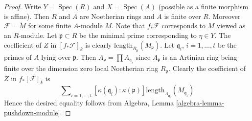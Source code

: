 \documentclass[10pt,a4paper]{amsart}
\theoremstyle{plain}
\theoremstyle{definition}
\theoremstyle{remark}
\numberwithin{equation}{subsection}
\def\Spec{\mathop{\mathrm{Spec}}}
\begin{document}
\begin{proof}
\medskip\noindent
Write $Y = \Spec(R)$ and $X = \Spec(A)$ (possible as
a finite morphism is affine).
Then $R$ and $A$ are Noetherian rings and $A$ is finite over $R$.
Moreover $\mathcal{F} = \widetilde{M}$ for some finite $A$-module
$M$. Note that $f_*\mathcal{F}$ corresponds to $M$ viewed as an $R$-module.
Let $\mathfrak p \subset R$ be the minimal prime corresponding
to $\eta \in Y$. The coefficient of $Z$ in $[f_*\mathcal{F}]_k$
is clearly $\text{length}_{R_{\mathfrak p}}(M_{\mathfrak p})$.
Let $\mathfrak q_i$, $i = 1, \ldots, t$ be the primes of $A$
lying over $\mathfrak p$. Then $A_{\mathfrak p} = \prod A_{\mathfrak q_i}$
since $A_{\mathfrak p}$ is an Artinian ring being finite over the
dimension zero local Noetherian ring $R_{\mathfrak p}$.
Clearly the coefficient of $Z$ in $f_*[\mathcal{F}]_k$ is
$$
\sum\nolimits_{i = 1, \ldots, t}
[\kappa(\mathfrak q_i) : \kappa(\mathfrak p)]
\text{length}_{A_{\mathfrak q_i}}(M_{\mathfrak q_i})
$$
Hence the desired equality follows from
Algebra, Lemma \ref{algebra-lemma-pushdown-module}.
\end{proof}
\end{document}
